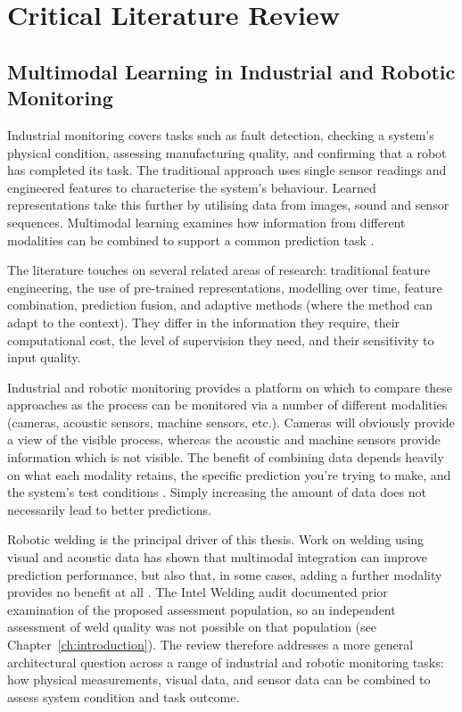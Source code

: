 \chapter{Critical Literature Review}

\label{ch:literature}

\section*{Multimodal Learning in Industrial and Robotic Monitoring}


Industrial monitoring covers tasks such as fault detection, checking a system's physical condition,
assessing manufacturing quality, and confirming that a robot has completed its task. The traditional
approach uses single sensor readings and engineered features to characterise the system's behaviour.
Learned representations take this further by utilising data from images, sound and sensor sequences.
Multimodal learning examines how information from different modalities can be combined to support a
common prediction task \citep{Baltrusaitis2019Multimodal,Huo2022Multisensor,Thoduka2024Handover}.

The literature touches on several related areas of research: traditional feature engineering, the
use of pre-trained representations, modelling over time, feature combination, prediction fusion, and
adaptive methods (where the method can adapt to the context). They differ in the information they
require, their computational cost, the level of supervision they need, and their sensitivity to
input quality.

Industrial and robotic monitoring provides a platform on which to compare these approaches as the
process can be monitored via a number of different modalities (cameras, acoustic sensors, machine
sensors, etc.). Cameras will obviously provide a view of the visible process, whereas the acoustic
and machine sensors provide information which is not visible. The benefit of combining data depends
heavily on what each modality retains, the specific prediction you're trying to make, and the
system's test conditions \citep{Wang2020What,Hua2026Weld,Goodarzi2023Deep}. Simply increasing the
amount of data does not necessarily lead to better predictions.

Robotic welding is the principal driver of this thesis. Work on welding using visual and acoustic
data has shown that multimodal integration can improve prediction performance, but also that, in
some cases, adding a further modality provides no benefit at all \citep{P003,Hua2026Weld}. The Intel
Welding audit documented prior examination of the proposed assessment population, so an independent
assessment of weld quality was not possible on that population (see Chapter~\ref{ch:introduction}).
The review therefore addresses a more general architectural question across a range of industrial
and robotic monitoring tasks: how physical measurements, visual data, and sensor data can be
combined to assess system condition and task outcome.

